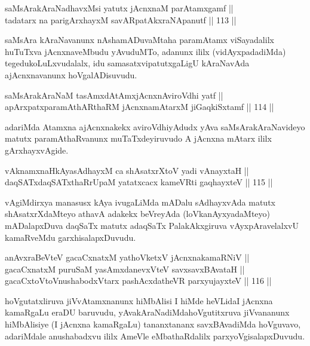 \begin{shl}
saMsArakAraNadhavxMsi yatutx jAcnxnaM parAtamxgamf ||  \\
tadatarx na parigArxhayxM savARpatAkxraNApanutf \hfill || 113 ||  
\end{shl}

\begin{artha}
saMsAra kAraNavanunx nAshamADuvaMtaha paramAtamx viSayadalilx huTuTxva
jAcnxnaveMbudu yAvuduMTo, adanunx ililx (vidAyxpadadiMda)
tegedukoLuLxvudalalx, idu samasatxvipatutxgaLigU kAraNavAda
ajAcnxnavanunx hoVgalADisuvudu.
\end{artha}

\begin{shl}
saMsArakAraNaM tasAmxdAtAmxjAcnxnAviroVdhi yatf || \\
apArxpatxparamAthARthaRM jAcnxnamAtarxM jiGaqkiSxtamf \hfill || 114 ||  
\end{shl}

\begin{artha}
adariMda Atamxna ajAcnxnakekx aviroVdhiyAdudx yAva\break
saMsArakAraNavideyo matutx paramAthaRvanunx muTaTxdeyiruvudo A jAcnxna
mAtarx ililx gArxhayxvAgide.
\end{artha}

\begin{shl}
vAknamxnaHkAyasAdhayxM ca shAsatxrXtoV yadi vA\s nayxtaH || \\
daqSATxdaqSATxthaRrUpaM yatatxcacx kameVRti gaqhayxteV \hfill || 115 ||  
\end{shl}

\begin{artha}
vAgiMdirxya manasusx kAya ivugaLiMda mADalu sAdhayxvAda matutx
shAsatxrXdaMteyo athavA adakekx beVreyAda (loVkanAyxyadaMteyo)
mADalapxDuva daqSaTx matutx adaqSaTx PalakAkxgiruva vAyxpAravelalxvU
kamaRveMdu garxhisalapxDuvudu.
\end{artha}

\begin{shl}
anAvxraBeVteV gacaCxnatxM yathoVketxV jAcnxnakamaRNiV || \\
gacaCxnatxM puruSaM yasAmxdanevxVteV savxsavxBAvataH || \\
gacaCxtoV\s toV\s nushabodxV\s tarx pashAcxdatheVR parxyujayxteV \hfill || 116 ||  
\end{shl}

\begin{artha}
hoVgutatxliruva jiVvAtamxnanunx hiMbAlisi I hiMde heVLida\break I jAcnxna
kamaRgaLu eraDU baruvudu, yAvakAraNadiMda\break hoVgutitxruva jiVvananunx
hiMbAlisiye (I jAcnxna kamaRgaLu) tananxtananx savxBAvadiMda
hoVguvavo, adariMdale anushabadxvu ililx AmeVle eMbathaRdalilx
parxyoVgisalapxDuvudu.
\end{artha}

